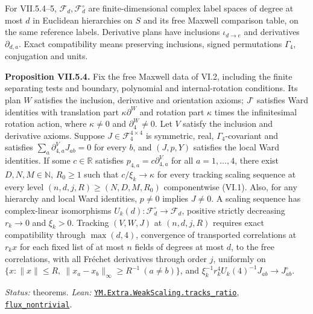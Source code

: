\documentclass[
  letterpaper,
  11pt]{article}
\begin{document}
For VII.5.4--5, \(\mathcal F_d,\mathcal F_d^\circ\) are
finite-dimensional complex label spaces of degree at most \(d\) in
Euclidean hierarchies on \(S\) and its free Maxwell comparison table, on
the same reference labels. Derivative plans have inclusions
\(\iota_{d\to e}\) and derivatives \(\partial_{d,a}\). Exact
compatibility means preserving inclusions, signed permutations
\(\Gamma_4\), conjugation and units.

\textbf{Proposition VII.5.4.} Fix the free Maxwell data of VI.2,
including the finite separating tests and boundary, polynomial and
internal-rotation conditions. Its plan \(W\) satisfies the inclusion,
derivative and orientation axioms; \(J^\circ\) satisfies Ward identities
with translation part \(\kappa\partial^W\) and rotation part \(\kappa\)
times the infinitesimal rotation action, where \(\kappa\ne0\) and
\(\partial^W_4\ne0\). Let \(V\) satisfy the inclusion and derivative
axioms. Suppose \(J\in\mathcal F_4^{4\times4}\) is symmetric, real,
\(\Gamma_4\)-covariant and satisfies \(\sum_a\partial^V_{4,a}J_{ab}=0\)
for every \(b\), and \((J,p,Y)\) satisfies the local Ward identities. If
some \(c\in\mathbb R\) satisfies \(p_{4,a}=c\partial^V_{4,a}\) for all
\(a=1,\ldots,4\), there exist \(D,N,M\in\mathbb N\), \(R_0\ge1\) such
that \(c/\xi_k\to\kappa\) for every tracking scaling sequence at every
level \((n,d,j,R)\ge(N,D,M,R_0)\) componentwise (VI.1). Also, for any
hierarchy and local Ward identities, \(p\ne0\) implies \(J\ne0\). A
scaling sequence has complex-linear isomorphisms
\(U_k(d):\mathcal F_d^\circ\to\mathcal F_d\), positive strictly
decreasing \(r_k\to0\) and \(\xi_k>0\). Tracking \((V,W,J)\) at
\((n,d,j,R)\) requires exact compatibility through \(\max(d,4)\),
convergence of transported correlations at \(r_kx\) for each fixed list
of at most \(n\) fields of degrees at most \(d\), to the free
correlations, with all Fréchet derivatives through order \(j\),
uniformly on
\(\{x:\|x\|\le R,\ \|x_a-x_b\|_\infty\ge R^{-1}\ (a\ne b)\}\), and
\(\xi_k^{-1}r_k^4U_k(4)^{-1}J_{ab}\to J^\circ_{ab}\).

\emph{Status:} theorems. \emph{Lean:}
\href{https://github.com/yang-mills-group/OpenAI-YM-20261028/blob/3456e5e75cf8d4cd558955a5c7638fba2d68f464/YM/Extra/WEAK_SCALING_ACTLAW/Orientation.lean\#L43-L54}{\texttt{YM.Extra.WeakScaling.tracks\_ratio}},
\href{https://github.com/yang-mills-group/OpenAI-YM-20261028/blob/3456e5e75cf8d4cd558955a5c7638fba2d68f464/YM/Extra/WEAK_SCALING_ACTLAW/Criteria.lean\#L64-L70}{\texttt{flux\_nontrivial}}.
\end{document}
